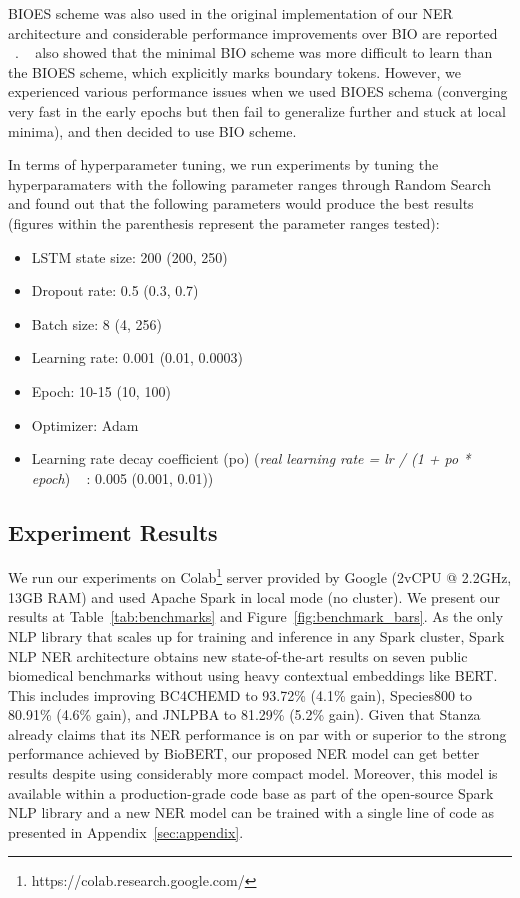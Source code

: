 \documentclass[a4paper,conference]{IEEEtran}
\begin{document}
BIOES scheme was also used in the original implementation of our NER architecture and considerable performance improvements over BIO are reported ~\cite{chiu2016named}. ~\cite{ratinov2009design} also showed that the minimal BIO scheme was more difficult to learn than the BIOES scheme, which explicitly marks boundary tokens. However, we experienced various performance issues when we used BIOES schema (converging very fast in the early epochs but then fail to generalize further and stuck at local minima), and then decided to use BIO scheme. 

In terms of hyperparameter tuning, we run experiments by tuning the hyperparamaters with the following parameter ranges through Random Search ~\cite{bergstra2012random} and found out that the following parameters would produce the best results (figures within the parenthesis represent the parameter ranges tested):
\begin{itemize}
\item LSTM state size: 200 (200, 250)
\item Dropout rate: 0.5 (0.3, 0.7)
\item Batch size: 8 (4, 256)
\item Learning rate: 0.001 (0.01, 0.0003)
\item Epoch: 10-15 (10, 100)
\item Optimizer: Adam
\item Learning rate decay coefficient (po) (\textit{real learning rate = lr / (1 + po * epoch}) ~\cite{smith2018disciplined} : 0.005 (0.001, 0.01))
\end{itemize}



\subsection{Experiment Results}
We run our experiments on Colab\footnote{https://colab.research.google.com/} server provided by Google (2vCPU @ 2.2GHz, 13GB RAM) and used Apache Spark in local mode (no cluster). We present our results at Table~\ref{tab:benchmarks} and Figure~\ref{fig:benchmark_bars}. As the only NLP library that scales up for training and inference in any Spark cluster, Spark NLP NER architecture obtains new state-of-the-art results on seven public biomedical benchmarks without using heavy contextual embeddings like BERT. This includes improving BC4CHEMD to 93.72\% (4.1\% gain), Species800 to 80.91\% (4.6\% gain), and JNLPBA to 81.29\% (5.2\% gain). Given that Stanza already claims that its NER performance is on par with or superior to the strong performance achieved by BioBERT, our proposed NER model can get better results despite using considerably more compact model. Moreover, this model is available within a production-grade code base as part of the open-source Spark NLP library and a new NER model can be trained with a single line of code as presented in Appendix~\ref{sec:appendix}.
\end{document}
